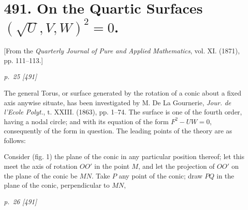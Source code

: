 ﻿\documentclass[11pt,a4paper]{article}
\theoremstyle{plain}
\theoremstyle{definition}
\begin{document}
\clearpage
\section*{491. On the Quartic Surfaces \((\sqrt{U},V,W)^2=0\).}
\begin{center}
\small [From the \textit{Quarterly Journal of Pure and Applied Mathematics},
vol. XI. (1871), pp. 111--113.]
\end{center}

\textit{p.~25 [491]}

The general Torus, or surface generated by the rotation of a conic about a
fixed axis anywise situate, has been investigated by M. De La Gournerie,
\textit{Jour. de l'Ecole Polyt.}, t. XXIII. (1863), pp. 1--74. The surface
is one of the fourth order, having a nodal circle; and with its equation of
the form \(F^2-UW=0\), consequently of the form in question. The leading
points of the theory are as follows:

Consider (fig. 1) the plane of the conic in any particular position
thereof; let this meet the axis of rotation \(OO'\) in the point \(M\), and
let the projection of \(OO'\) on the plane of the conic be \(MN\). Take
\(P\) any point of the conic; draw \(PQ\) in the plane of the conic,
perpendicular to \(MN\),

\begin{center}
\end{center}

\clearpage
\textit{p.~26 [491]}
\end{document}
